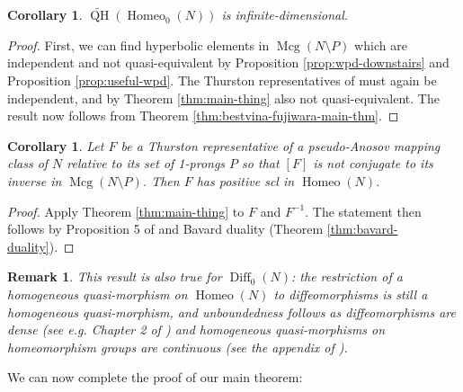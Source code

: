 \documentclass[a4paper]{article}
\newtheorem{remark}[theorem]{Remark}
\newtheorem{corollary}[theorem]{Corollary}
\begin{document}
\begin{corollary}\label{cor:inf-dim-qm}
    $\widetilde{\operatorname{QH}}(\operatorname{Homeo}_0(N))$ is infinite-dimensional.
\end{corollary}

\begin{proof}
    First, we can find hyperbolic elements in $\operatorname{Mcg}(N\setminus P)$ which are independent and not quasi-equivalent by Proposition \ref{prop:wpd-downstairs} and Proposition \ref{prop:useful-wpd}.
    The Thurston representatives of must again be independent, and by Theorem \ref{thm:main-thing} also not quasi-equivalent.
    The result now follows from Theorem \ref{thm:bestvina-fujiwara-main-thm}.
\end{proof}

\begin{corollary}\label{cor:scl-criterion}
    Let $F$ be a Thurston representative of a pseudo-Anosov mapping class of $N$ relative to its set of 1-prongs $P$ so that $[F]$ is not conjugate to its inverse in $\operatorname{Mcg}(N\setminus P)$.
    Then $F$ has positive scl in $\operatorname{Homeo}(N)$.
\end{corollary}

\begin{proof}
    Apply Theorem \ref{thm:main-thing} to $F$ and $F^{-1}$.
    The statement then follows by Proposition 5 of \cite{Bestvina} and Bavard duality (Theorem \ref{thm:bavard-duality}).
\end{proof}


\begin{remark}\label{rem:homeo-to-diff}
This result is also true for $\operatorname{Diff}_0(N)$:
the restriction of a homogeneous quasi-morphism on $\operatorname{Homeo}(N)$ to diffeomorphisms is still a homogeneous quasi-morphism, and unboundedness follows as diffeomorphisms are dense (see e.g. Chapter 2 of \cite{hirsch}) and homogeneous quasi-morphisms on homeomorphism groups are continuous (see the appendix of \cite{BHW1}).
\end{remark}

We can now complete the proof of our main theorem:
\end{document}
